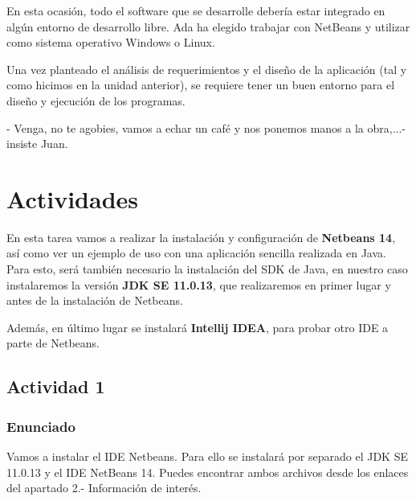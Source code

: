 En esta ocasión, todo el software que se desarrolle debería estar integrado en algún entorno de desarrollo libre. Ada ha elegido trabajar con NetBeans y utilizar como sistema operativo Windows o Linux.

Una vez planteado el análisis de requerimientos y el diseño de la aplicación (tal y como hicimos en la unidad anterior), se requiere tener un buen entorno para el diseño y ejecución de los programas.

- Venga, no te agobies, vamos a echar un café y nos ponemos manos a la obra,...- insiste Juan.

\section{Actividades}
En esta tarea vamos a realizar la instalación y configuración de \textbf{Netbeans 14}, así como ver un ejemplo de uso con una aplicación sencilla realizada en Java. Para esto, será también necesario la instalación del SDK de Java, en nuestro caso instalaremos la versión \textbf{JDK SE 11.0.13}, que realizaremos en primer lugar y antes de la instalación de Netbeans.

Además, en último lugar se instalará \textbf{Intellij IDEA}, para probar otro IDE a parte de Netbeans.

\subsection{Actividad 1}

\subsubsection{Enunciado}
Vamos a instalar el IDE Netbeans. Para ello se instalará por separado el JDK SE 11.0.13 y el IDE NetBeans 14. Puedes encontrar ambos archivos desde los enlaces del apartado 2.- Información de interés.

